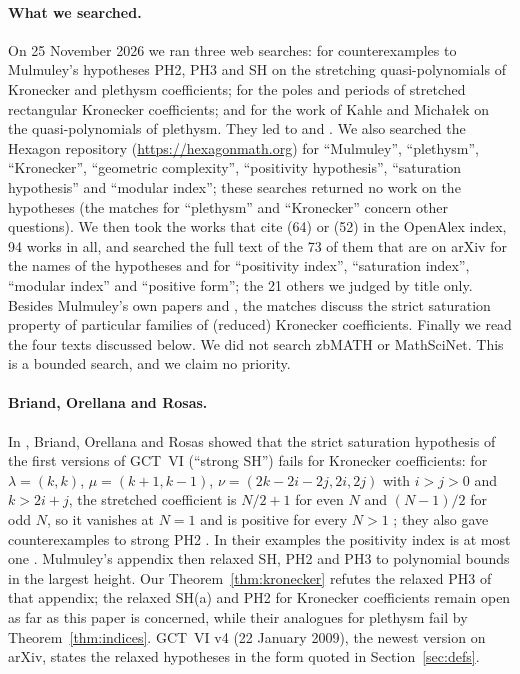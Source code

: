\paragraph{What we searched.}
On 25 November 2026 we ran three web searches: for counterexamples to
Mulmuley's hypotheses PH2, PH3 and SH on the stretching quasi-polynomials of
Kronecker and plethysm coefficients; for the poles and periods of stretched
rectangular Kronecker coefficients; and for the work of Kahle and
Micha\l{}ek on the quasi-polynomials of plethysm. They led to \cite{BOR} and
\cite{KM}. We also searched the Hexagon repository
(\url{https://hexagonmath.org}) for ``Mulmuley'', ``plethysm'',
``Kronecker'', ``geometric complexity'', ``positivity hypothesis'',
``saturation hypothesis'' and ``modular index''; these searches returned no
work on the hypotheses (the matches for ``plethysm'' and ``Kronecker'' concern
other questions). We then took the works that cite \cite{GCT6} (64) or
\cite{BOR} (52) in the OpenAlex index, 94 works in all, and searched the full
text of the 73 of them that are on arXiv for the names of the hypotheses and
for ``positivity index'', ``saturation index'', ``modular index'' and
``positive form''; the 21 others we judged by title only. Besides Mulmuley's
own papers and \cite{BOR}, the matches discuss the strict saturation property
of particular families of (reduced) Kronecker coefficients. Finally we read the
four texts discussed below. We did not search zbMATH or MathSciNet. This is a
bounded search, and we claim no priority.

\paragraph{Briand, Orellana and Rosas.}
In \cite{BOR}, Briand, Orellana and Rosas showed that the strict saturation
hypothesis of the first versions of GCT~VI (``strong SH'') fails for Kronecker
coefficients: for $\lambda=(k,k)$, $\mu=(k+1,k-1)$, $\nu=(2k-2i-2j,2i,2j)$
with $i>j>0$ and $k>2i+j$, the stretched coefficient is $N/2+1$ for even $N$ and $(N-1)/2$ for odd $N$, so it vanishes at $N=1$ and is positive for every $N>1$ \cite[Theorem 2.4, p.~7]{BOR}; they also gave
counterexamples to strong PH2 \cite[Section 2.4, p.~8]{BOR}. In their examples
the positivity index is at most one \cite[Section 2.5, p.~8]{BOR}. Mulmuley's
appendix \cite[pp.~18--20]{BOR} then relaxed SH, PH2 and PH3 to polynomial
bounds in the largest height. Our Theorem~\ref{thm:kronecker} refutes the
relaxed PH3 of that appendix; the relaxed SH(a) and PH2 for Kronecker
coefficients remain open as far as this paper is concerned, while their
analogues for plethysm fail by Theorem~\ref{thm:indices}. GCT~VI v4 (22 January
2009), the newest version on arXiv, states the relaxed hypotheses in the form
quoted in Section~\ref{sec:defs}.

